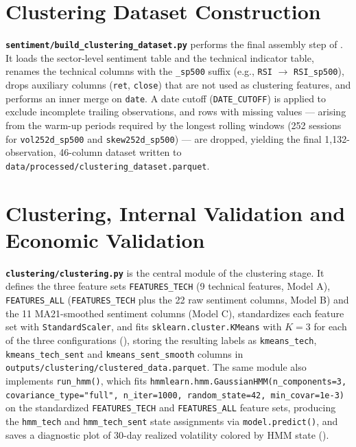 \section{Clustering Dataset Construction}
\label{annex:pipeline-dataset}

\textbf{\texttt{sentiment/build\_clustering\_dataset.py}} performs the
final assembly step of . It loads the sector-level
sentiment table and the technical indicator table, renames the technical
columns with the \texttt{\_sp500} suffix (e.g., \texttt{RSI} $\to$
\texttt{RSI\_sp500}), drops auxiliary columns (\texttt{ret}, \texttt{close})
that are not used as clustering features, and performs an inner merge on
\texttt{date}. A date cutoff (\texttt{DATE\_CUTOFF}) is applied to exclude
incomplete trailing observations, and rows with missing values --- arising
from the warm-up periods required by the longest rolling windows
(252 sessions for \texttt{vol252d\_sp500} and \texttt{skew252d\_sp500}) ---
are dropped, yielding the final 1{,}132-observation, 46-column dataset
written to \texttt{data/processed/clustering\_dataset.parquet}.

\section{Clustering, Internal Validation and Economic Validation}
\label{annex:pipeline-clustering}

\textbf{\texttt{clustering/clustering.py}} is the central module of the
clustering stage. It defines the three feature sets \texttt{FEATURES\_TECH}
(9 technical features, Model A), \texttt{FEATURES\_ALL} (\texttt{FEATURES\_TECH}
plus the 22 raw sentiment columns, Model B) and the 11 MA21-smoothed
sentiment columns (Model C), standardizes each feature set with
\texttt{StandardScaler}, and fits \texttt{sklearn.cluster.KMeans} with
$K=3$ for each of the three configurations (),
storing the resulting labels as \texttt{kmeans\_tech}, \texttt{kmeans\_tech\_sent}
and \texttt{kmeans\_sent\_smooth} columns in
\texttt{outputs/clustering/clustered\_data.parquet}. The same module also
implements \texttt{run\_hmm()}, which fits
\texttt{hmmlearn.hmm.GaussianHMM(n\_components=3, covariance\_type="full",
n\_iter=1000, random\_state=42, min\_covar=1e-3)} on the standardized
\texttt{FEATURES\_TECH} and \texttt{FEATURES\_ALL} feature sets, producing
the \texttt{hmm\_tech} and \texttt{hmm\_tech\_sent} state assignments via
\texttt{model.predict()}, and saves a diagnostic plot of 30-day realized
volatility colored by HMM state
().

